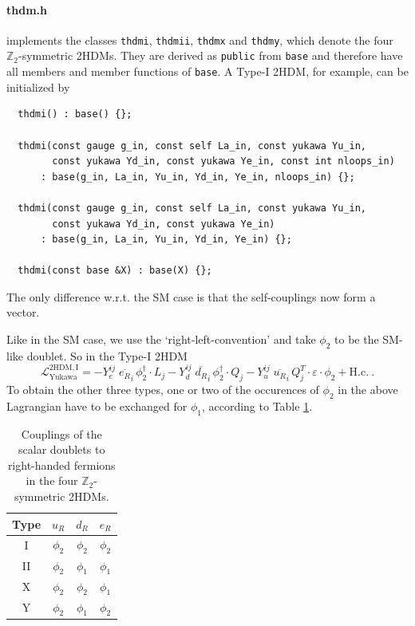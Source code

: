 \documentclass[preprint,12pt]{elsarticle}
\begin{document}
\paragraph{thdm.h}
implements the classes \texttt{thdmi}, \texttt{thdmii}, \texttt{thdmx} and \texttt{thdmy}, which denote the four $\mathbb{Z}_2$-symmetric 2HDMs.
They are derived as \texttt{public} from \texttt{base} and therefore have all members and member functions of \texttt{base}.
A Type-I 2HDM, for example, can be initialized by
\begin{lstlisting}
  thdmi() : base() {};
 
  thdmi(const gauge g_in, const self La_in, const yukawa Yu_in,
        const yukawa Yd_in, const yukawa Ye_in, const int nloops_in)
      : base(g_in, La_in, Yu_in, Yd_in, Ye_in, nloops_in) {};
      
  thdmi(const gauge g_in, const self La_in, const yukawa Yu_in,
        const yukawa Yd_in, const yukawa Ye_in)
      : base(g_in, La_in, Yu_in, Yd_in, Ye_in) {};
      
  thdmi(const base &X) : base(X) {};
\end{lstlisting}
The only difference w.r.t. the SM case is that the self-couplings now form a vector.

Like in the SM case, we use the `right-left-convention' and take $\phi_2$ to be the SM-like doublet. So in the Type-I 2HDM
\begin{equation} \label{eq:thdm_yuk}
    \mathcal{L}_{\mathrm{Yukawa}}^{\mathrm{2HDM,I}} = - Y_e^{ij}\; \overline{e_{R}}_{i} \, \phi_2^\dagger \cdot L_j
  - Y_d^{ij}\; \overline{d_{R}}_{i} \, \phi_2^\dagger \cdot Q_j
  - Y_u^{ij}\; \overline{u_{R}}_{i} \, Q_j^T \cdot \varepsilon \cdot \phi_2 + \mathrm{H.c.}~.
\end{equation}
To obtain the other three types, one or two of the occurences of $\phi_2$ in the above Lagrangian have to be exchanged for $\phi_1$, according to Table \ref{tbl::2hdm}.

\begin{table}
  \centering
  \begin{tabular}{cccc} \toprule
    Type & $u_R$ & $d_R$ & $e_R$ \\\midrule
    I & $\phi_2$ & $\phi_2$ & $\phi_2$ \\
    II & $\phi_2$ & $\phi_1$ & $\phi_1$ \\
    X & $\phi_2$ & $\phi_2$ & $\phi_1$ \\
    Y & $\phi_2$ & $\phi_1$ & $\phi_2$ \\
    \bottomrule
  \end{tabular}
  \caption{\label{tbl::2hdm} Couplings of the scalar doublets to right-handed fermions in the four $\mathbb{Z}_2$-symmetric 2HDMs.}
\end{table}
\end{document}
